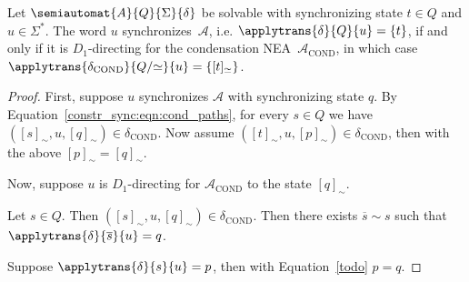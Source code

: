 

\begin{proposition} 
 Let $\semiautomat{A}{Q}{\Sigma}{\delta}$ be solvable with synchronizing state $t \in Q$
 and $u \in \Sigma^*$.
 The word $u$ synchronizes~$\mathcal A$, i.e. $\applytrans{\delta}{Q}{u} = \{t\}$,
 if and only if it is $D_1$-directing for the condensation NEA~$\mathcal A_{\text{COND}}$,
 in which case $\applytrans{\delta_{\text{COND}}}{Q/{\simeq}}{u} = \{ [t]_{\simeq} \}$.
\end{proposition}
\begin{proof}
 First, suppose $u$ synchronizes $\mathcal A$ with synchronizing state $q$.
 By Equation~\eqref{constr_sync:eqn:cond_paths},
 for every $s \in Q$
 we have $([s]_{\sim}, u, [q]_{\sim}) \in \delta_{\text{COND}}$.
 Now assume $([t]_{\sim}, u, [p]_{\sim}) \in \delta_{\text{COND}}$,
 then with the above $[p]_{\sim} = [q]_{\sim}$. 
 
 Now, suppose $u$ is $D_1$-directing for $\mathcal A_{\text{COND}}$
 to the state $[q]_{\sim}$. %
 
 
 Let $s \in Q$.
 Then $([s]_{\sim}, u, [q]_{\sim}) \in \delta_{\text{COND}}$.
 Then %
 there exists $\overline s \sim s$
 such that $\applytrans{\delta}{\overline s}{u} = q$. %
 
 
 
 
 
 
 Suppose $\applytrans{\delta}{s}{u} = p$,
 then with Equation~\eqref{todo} 
 $p = q$. %
 
 
 

\end{proof}
